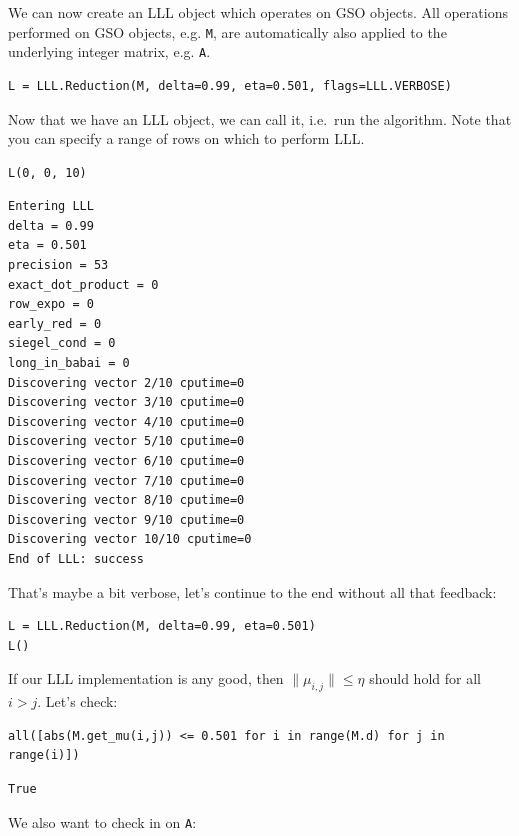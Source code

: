 \documentclass[10pt,a4paper,nobib]{tufte-handout}
\begin{document}
We can now create an LLL object which operates on GSO objects. All operations performed on GSO objects, e.g. \texttt{M}, are automatically also applied to the underlying integer matrix, e.g. \texttt{A}.

\lstset{language=sage,label= ,caption= ,captionpos=b,numbers=none}
\begin{lstlisting}
L = LLL.Reduction(M, delta=0.99, eta=0.501, flags=LLL.VERBOSE)
\end{lstlisting}

Now that we have an LLL object, we can call it, i.e. run the algorithm. Note that you can specify a range of rows on which to perform LLL.

\lstset{language=sage,label= ,caption= ,captionpos=b,numbers=none}
\begin{lstlisting}
L(0, 0, 10)
\end{lstlisting}

\begin{verbatim}
Entering LLL
delta = 0.99
eta = 0.501
precision = 53
exact_dot_product = 0
row_expo = 0
early_red = 0
siegel_cond = 0
long_in_babai = 0
Discovering vector 2/10 cputime=0
Discovering vector 3/10 cputime=0
Discovering vector 4/10 cputime=0
Discovering vector 5/10 cputime=0
Discovering vector 6/10 cputime=0
Discovering vector 7/10 cputime=0
Discovering vector 8/10 cputime=0
Discovering vector 9/10 cputime=0
Discovering vector 10/10 cputime=0
End of LLL: success
\end{verbatim}

That’s maybe a bit verbose, let’s continue to the end without all that feedback:

\lstset{language=sage,label= ,caption= ,captionpos=b,numbers=none}
\begin{lstlisting}
L = LLL.Reduction(M, delta=0.99, eta=0.501)  
L()
\end{lstlisting}

If our LLL implementation is any good, then \(\|μ_{i,j}\| ≤ η\) should hold for all \(i>j\). Let’s check:

\lstset{language=sage,label= ,caption= ,captionpos=b,numbers=none}
\begin{lstlisting}
all([abs(M.get_mu(i,j)) <= 0.501 for i in range(M.d) for j in range(i)])
\end{lstlisting}

\begin{verbatim}
True
\end{verbatim}

We also want to check in on \texttt{A}:
\end{document}
